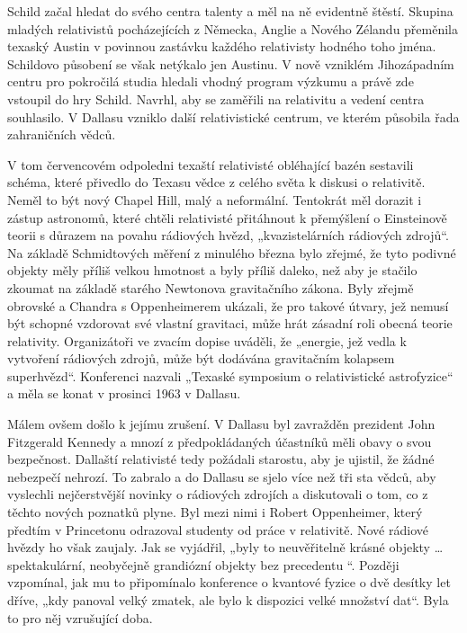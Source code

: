   Schild začal hledat do svého centra talenty a měl na ně evidentně štěstí. Skupina mladých
  relativistů pocházejících z Německa, Anglie a Nového Zélandu přeměnila texaský Austin v povinnou
  zastávku každého relativisty hodného toho jména. Schildovo působení se však netýkalo jen Austinu.
  V nově vzniklém Jihozápadním centru pro pokročilá studia hledali vhodný program výzkumu a právě
  zde vstoupil do hry Schild. Navrhl, aby se zaměřili na relativitu a vedení centra souhlasilo. V
  Dallasu vzniklo další relativistické centrum, ve kterém působila řada zahraničních vědců. 

  V tom červencovém odpoledni texaští relativisté obléhající bazén sestavili schéma, které přivedlo
  do Texasu vědce z celého světa k diskusi o relativitě. Neměl to být nový Chapel Hill, malý a
  neformální. Tentokrát měl dorazit i zástup astronomů, které chtěli relativisté přitáhnout k
  přemýšlení o Einsteinově teorii s důrazem na povahu rádiových hvězd, „kvazistelárních rádiových
  zdrojů“. Na základě Schmidtových měření z minulého března bylo zřejmé, že tyto podivné objekty
  měly příliš velkou hmotnost a byly příliš daleko, než aby je stačilo zkoumat na základě starého
  Newtonova gravitačního zákona. Byly zřejmě obrovské a Chandra s Oppenheimerem ukázali, že pro
  takové útvary, jež nemusí být schopné vzdorovat své vlastní gravitaci, může hrát zásadní roli
  obecná teorie relativity. Organizátoři ve zvacím dopise uváděli, že „energie, jež vedla k
  vytvoření rádiových zdrojů, může být dodávána gravitačním kolapsem superhvězd“. Konferenci nazvali
  „Texaské symposium o relativistické astrofyzice“ a měla se konat v prosinci 1963 v Dallasu. 

  Málem ovšem došlo k jejímu zrušení. V Dallasu byl zavražděn prezident John Fitzgerald Kennedy a
  mnozí z předpokládaných účastníků měli obavy o svou bezpečnost. Dallaští relativisté tedy požádali
  starostu, aby je ujistil, že žádné nebezpečí nehrozí. To zabralo a do Dallasu se sjelo více než
  tři sta vědců, aby vyslechli nejčerstvější novinky o rádiových zdrojích a diskutovali o tom, co z
  těchto nových poznatků plyne. Byl mezi nimi i Robert Oppenheimer, který předtím v Princetonu
  odrazoval studenty od práce v relativitě. Nové rádiové hvězdy ho však zaujaly. Jak se vyjádřil,
  „byly to neuvěřitelně krásné objekty … spektakulární, neobyčejně grandiózní objekty bez precedentu
  “. Později vzpomínal, jak mu to připomínalo konference o kvantové fyzice o dvě desítky let dříve,
  „kdy panoval velký zmatek, ale bylo k dispozici velké množství dat“. Byla to pro něj vzrušující
  doba. 


